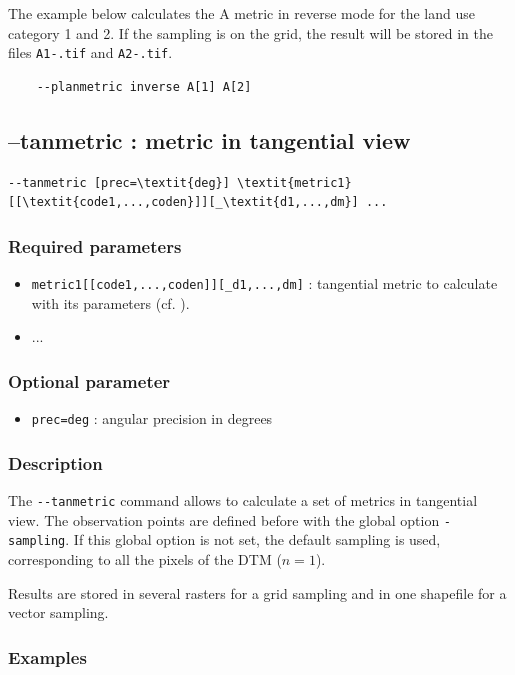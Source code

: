 \documentclass{report}
\begin{document}
The example below calculates the A metric in reverse mode for the land use category 1 and 2. If the sampling is on the grid, the result will be stored in the files \verb|A1-.tif| and \verb|A2-.tif|.
\begin{Verbatim}
	--planmetric inverse A[1] A[2]
\end{Verbatim}


\subsection{--tanmetric : metric in tangential view}
\begin{Verbatim}[commandchars=\\\{\}]
--tanmetric [prec=\textit{deg}] \textit{metric1}[[\textit{code1,...,coden}]][_\textit{d1,...,dm}] ...
\end{Verbatim}

\subsubsection{Required parameters}
\begin{itemize}
	\item \verb|metric1[[code1,...,coden]][_d1,...,dm]| : tangential metric to calculate with its parameters (cf. ).
	\item ...
\end{itemize}

\subsubsection{Optional parameter}
\begin{itemize}
	\item \verb|prec=deg| : angular precision in degrees
\end{itemize}

\subsubsection{Description}
The \verb|--tanmetric| command allows to calculate a set of metrics in tangential view. The observation points are defined before with the global option \verb|-sampling|. 
If this global option is not set, the default sampling is used, corresponding to all the pixels of the DTM ($n=1$).

Results are stored in several rasters for a grid sampling and in one shapefile for a vector sampling.


\subsubsection{Examples}
\end{document}
